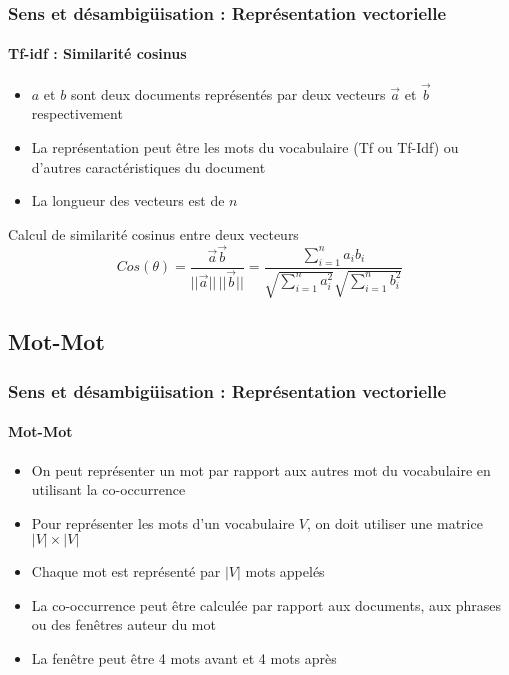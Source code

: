 \documentclass[xcolor=table]{beamer}
\begin{document}
\begin{frame}
\frametitle{Sens et désambigüisation : Représentation vectorielle}
\framesubtitle{Tf-idf : Similarité cosinus}

\begin{minipage}{.68\textwidth}
\begin{itemize}
	\item $a$ et $b$ sont deux documents représentés par deux vecteurs $\overrightarrow{a}$ et $\overrightarrow{b}$ respectivement
	\item La représentation peut être les mots du vocabulaire (Tf ou Tf-Idf) ou d'autres caractéristiques du document
	\item La longueur des vecteurs est de $n$
\end{itemize}
\end{minipage}
\begin{minipage}{.3\textwidth}
\end{minipage}

\begin{block}{Calcul de similarité cosinus entre deux vecteurs}
	\[
	Cos(\theta) = \frac{\overrightarrow{a} \overrightarrow{b}}{||\overrightarrow{a}||\, ||\overrightarrow{b}||}
	= \frac{\sum_{i=1}^{n} a_i b_i}{\sqrt{\sum_{i=1}^{n} a_i^2} \sqrt{\sum_{i=1}^{n} b_i^2}}
	\]
\end{block}

\end{frame}

\subsection{Mot-Mot}

\begin{frame}
\frametitle{Sens et désambigüisation : Représentation vectorielle}
\framesubtitle{Mot-Mot}

\begin{itemize}
	\item On peut représenter un mot par rapport aux autres mot du vocabulaire en utilisant la co-occurrence
	\item Pour représenter les mots d'un vocabulaire $ V $, on doit utiliser une matrice $|V| \times |V|$
	\item Chaque mot est représenté par $|V|$ mots appelés 
	\item La co-occurrence peut être calculée par rapport aux documents, aux phrases ou des fenêtres auteur du mot
	\item La fenêtre peut être 4 mots avant et 4 mots après
\end{itemize}

\end{frame}
\end{document}
